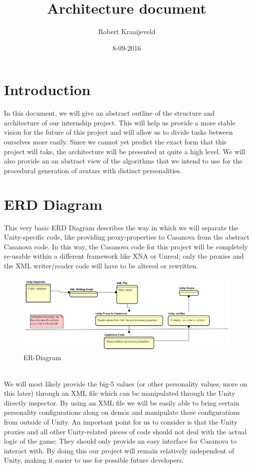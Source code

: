 \documentclass{article}
\title{Architecture document}
\date{8-09-2016}
\author{Robert Kraaijeveld}
\begin{document}
  \maketitle
  \newpage
  \tableofcontents

  \newpage
  \section{Introduction}
  In this document, we will give an abstract outline of the structure and architecture of our internship project. 
  This will help us provide a more stable vision for the future of this project and will allow us to divide tasks between ourselves more easily.
  Since we cannot yet predict the exact form that this project will take, the architecture will be presented at quite a high level. We will also
  provide an an abstract view of the algorithms that we intend to use for the procedural generation of avatars with distinct personalities.


  \newpage
  \section{ERD Diagram}
  This very basic ERD Diagram describes the way in which we will separate the Unity-specific code, like providing proxy-properties to Casanova from the abstract Casanova code. In this way, the Casanova code for this project will be completely re-usable within a different framework like XNA or Unreal; only the proxies and the XML writer/reader code will have to be altered or rewritten.

  \begin{figure}[h]
	\includegraphics[width=1.4\textwidth]{ER.png}
	\caption{ER-Diagram}
	\label{fig:figure2}
  \end{figure}

  ~\\
  We will most likely provide the big-5 values (or other personality values, more on this later) through an XML file which can be manipulated through the Unity directly inspector. By using an XML file we will be easily able to bring certain personality configurations along on demos and manipulate these configurations from outside of Unity. An important point for us to consider is that the Unity proxies and all other Unity-related pieces of code should not deal with the actual logic of the game; They should only provide an easy interface for Casanova to interact with. By doing this our project will remain relatively independent of Unity, making it easier to use for possible future developers.
\end{document}
